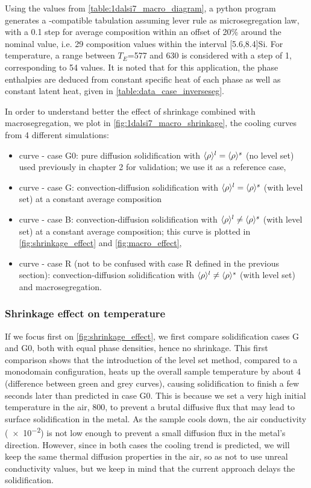 Using the values from \cref{table:1dalsi7_macro_diagram}, a python program generates a \cimlib-compatible tabulation assuming lever rule as microsegregation law, 
with a \SI{0.1}{\ucomposition} step for average composition within an offset of 20\% around the nominal value, i.e.
29 composition values within the interval [5.6,8.4]\si{\ucomposition}Si.
For temperature, a range between $T_E$=\SI{577}{\udegC} and \SI{630}{\udegC} is considered with a step of \SI{1}{\udegC}, corresponding to 54 values. It is noted that for this application,
the phase enthalpies are deduced from constant specific heat of each phase as well as constant latent heat, given in \cref{table:data_case_inverseseg}.

In order to understand better the effect of shrinkage combined with macrosegregation, we plot in \cref{fig:1dalsi7_macro_shrinkage},
the cooling curves from 4 different simulations: 
\begin{itemize}
\itemsep0em
\item {} curve - case G0: pure diffusion solidification with $\langle \rho \rangle^l=\langle \rho \rangle^s$ (no level set) used previously in chapter 2 for validation;
we use it as a reference case,
\item {} curve - case G: convection-diffusion solidification with $\langle \rho \rangle^l=\langle \rho \rangle^s$ (with level set) at a constant average composition
\item {} curve - case B: convection-diffusion solidification with $\langle \rho \rangle^l \neq \langle \rho \rangle^s$ (with level set) at a constant average composition; this curve is plotted in 
\cref{fig:shrinkage_effect} and \cref{fig:macro_effect},
\item {} curve - case R (not to be confused with case R defined in the previous section): 
convection-diffusion solidification with $\langle \rho \rangle^l \neq \langle \rho \rangle^s$ (with level set) and macrosegregation.
\end{itemize}

\subsubsection{Shrinkage effect on temperature}

If we focus first on \cref{fig:shrinkage_effect}, we first compare solidification cases G and G0, both with equal phase densities, hence no shrinkage.
This first comparison shows that the introduction of the level set method, compared to a monodomain configuration, heats up
the overall sample temperature by about \SI{4}{\udegC} (difference between green and grey curves), causing solidification to finish a few seconds later than predicted in case G0.
This is because we set a very high initial temperature in the air, \SI{800}{\udegC}, to prevent a brutal diffusive flux that may lead to surface solidification
in the metal. As the sample cools down, the air conductivity (\SI{e-2}{\uconductivity}) is not low enough to prevent a small diffusion flux in the metal's direction.
However, since in both cases the cooling trend is predicted, we will keep the same thermal diffusion properties in the air, so as not to use unreal conductivity values,
but we keep in mind that the current approach delays the solidification.

